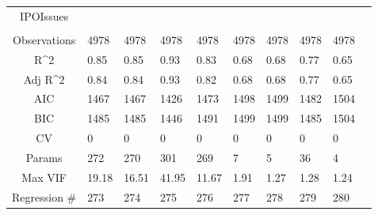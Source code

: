 \documentclass{article}
\begin{document}
\begin{table}[H]
\begin{tabular}{|clllllllll|}
  IPOIssues &  &  &  &  &  &  &  &  & \\ 
   &  &  &  &  &  &  &  &  & \\ 
  \hline 
 Observations & 4978 & 4978 & 4978 & 4978 & 4978 & 4978 & 4978 & 4978 & \\ 
  R^2 & 0.85 & 0.85 & 0.93 & 0.83 & 0.68 & 0.68 & 0.77 & 0.65 & \\ 
  Adj R^2 & 0.84 & 0.84 & 0.93 & 0.82 & 0.68 & 0.68 & 0.77 & 0.65 & \\ 
  AIC & 1467 & 1467 & 1426 & 1473 & 1498 & 1499 & 1482 & 1504 & \\ 
  BIC & 1485 & 1485 & 1446 & 1491 & 1499 & 1499 & 1485 & 1504 & \\ 
  CV & 0 & 0 & 0 & 0 & 0 & 0 & 0 & 0 & \\ 
  Params & 272 & 270 & 301 & 269 & 7 & 5 & 36 & 4 & \\ 
  Max VIF & 19.18 & 16.51 & 41.95 & 11.67 & 1.91 & 1.27 & 1.28 & 1.24 & \\ 
  Regression \# & 273 & 274 & 275 & 276 & 277 & 278 & 279 & 280 & \\ 
   \hline
\end{tabular}
 
\end{table}
\end{document}
